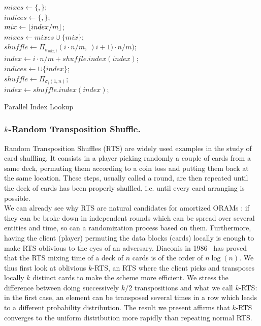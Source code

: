 \documentclass[USenglish,oneside,twocolumn]{article}
\DeclarePairedDelimiter\floor{\lfloor}{\rfloor}
\begin{document}
\begin{algorithm}
\DontPrintSemicolon
{}
$mixes \gets \{,\}$;\\
$indices \gets \{,\}$;\\
{
	$mix \gets \floor{index/m}$;\\
	$mixes \gets mixes \cup \{mix \}$;\\
	$shuffle \gets {\Pi}_{\sigma_{mix,i}}(i\cdot n / m,\ )i+1)\cdot n / m)$;\\
	$index \gets i\cdot n/m + shuffle.index(index)$;\\
	$indices \gets \cup \{index\}$;\\
	$shuffle \gets {\Pi}_{\sigma_{i}(1,n)}$;\\
	$index \gets shuffle.index(index)$;\\
}
\caption{Parallel Index Lookup}
\label{alg:PIL}
\end{algorithm}

%
\subsubsection{$k$-Random Transposition Shuffle.}\label{kRTS}
Random Transposition Shuffles (RTS) are widely used examples in the study of card shuffling. It consists in a player picking randomly a couple of cards from a same deck, permuting them according to a coin toss and putting them back at the same location.
These steps, usually called a round, are then repeated until the deck of cards has been properly shuffled, i.e. until every card arranging is possible.\\
We can already see why RTS are natural candidates for amortized ORAMs : if they can be broke down in independent rounds which can be spread over several entities and time, so can a randomization process based on them. Furthermore, having the client (player) permuting the data blocks (cards) locally is enough to make RTS oblivious to the eyes of an adversary.
Diaconis in 1986~\cite{aldous1986shuffling} has proved that the RTS mixing time of a deck of $n$ cards is of the order of $n\log(n)$. We thus first look at oblivious $k$-RTS, an RTS where the client picks and transposes locally $k$ distinct cards to make the scheme more efficient. We stress the difference between doing successively $k/2$ transpositions and what we call $k$-RTS: in the first case, an element can be transposed several times in a row which leads to a different probability distribution. The result we present affirms that  $k$-RTS converges to the uniform distribution more rapidly than repeating normal RTS.  
\end{document}
